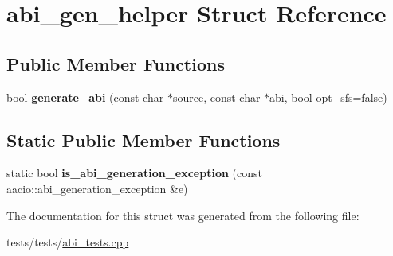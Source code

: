 \hypertarget{structabi__gen__helper}{}\section{abi\+\_\+gen\+\_\+helper Struct Reference}
\label{structabi__gen__helper}
\subsection*{Public Member Functions}
\begin{DoxyCompactItemize}
\item 
\mbox{\label{structabi__gen__helper_a153aa445940bd37f0d985c720829df40}} 
bool {\bfseries generate\+\_\+abi} (const char $\ast$\mbox{\hyperlink{structsource}{source}}, const char $\ast$abi, bool opt\+\_\+sfs=false)
\end{DoxyCompactItemize}
\subsection*{Static Public Member Functions}
\begin{DoxyCompactItemize}
\item 
\mbox{\label{structabi__gen__helper_aa3cfd94d3d48f348a3718e77c26fe024}} 
static bool {\bfseries is\+\_\+abi\+\_\+generation\+\_\+exception} (const aacio\+::abi\+\_\+generation\+\_\+exception \&e)
\end{DoxyCompactItemize}


The documentation for this struct was generated from the following file\+:\begin{DoxyCompactItemize}
\item 
tests/tests/\mbox{\hyperlink{abi__tests_8cpp}{abi\+\_\+tests.\+cpp}}\end{DoxyCompactItemize}
